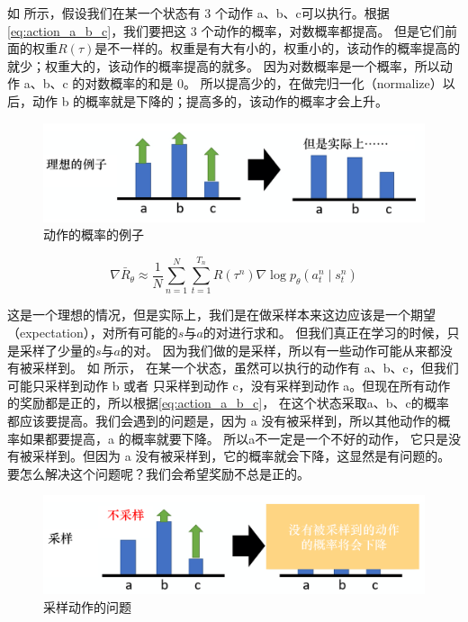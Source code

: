 
如 所示，假设我们在某一个状态有 3 个动作 a、b、c可以执行。根据\eqref{eq:action_a_b_c}，我们要把这 3 个动作的概率，对数概率都提高。 但是它们前面的权重$R(\tau)$是不一样的。权重是有大有小的，权重小的，该动作的概率提高的就少；权重大的，该动作的概率提高的就多。 因为对数概率是一个概率，所以动作 a、b、c 的对数概率的和是 0。 所以提高少的，在做完归一化（normalize）以后，动作 b 的概率就是下降的；提高多的，该动作的概率才会上升。

\begin{figure}[hbt]
    \centering
    \includegraphics[width=0.5\linewidth]{res/ch4/4.12}
    \caption{动作的概率的例子}
    \label{fig:fig4.12}
\end{figure}

\begin{equation}
    \label{eq:action_a_b_c}
    \nabla \bar{R}_{\theta} \approx \frac{1}{N} \sum_{n=1}^{N} \sum_{t=1}^{T_{n}} R\left(\tau^{n}\right) \nabla \log p_{\theta}\left(a_{t}^{n} \mid s_{t}^{n}\right)
\end{equation}

这是一个理想的情况，但是实际上，我们是在做采样本来这边应该是一个期望（expectation），对所有可能的$s$与$a$的对进行求和。 但我们真正在学习的时候，只是采样了少量的$s$与$a$的对。 因为我们做的是采样，所以有一些动作可能从来都没有被采样到。
如 所示，
在某一个状态，虽然可以执行的动作有 a、b、c，但我们可能只采样到动作 b 或者 只采样到动作 c，没有采样到动作 a。但现在所有动作的奖励都是正的，所以根据\eqref{eq:action_a_b_c}，
在这个状态采取a、b、c的概率都应该要提高。我们会遇到的问题是，因为 a 没有被采样到，所以其他动作的概率如果都要提高，a 的概率就要下降。 所以a不一定是一个不好的动作， 它只是没有被采样到。但因为 a 没有被采样到，它的概率就会下降，这显然是有问题的。要怎么解决这个问题呢？我们会希望奖励不总是正的。
\begin{figure}[hbt]
    \centering
    \includegraphics[width=0.5\linewidth]{res/ch4/4.13}
    \caption{采样动作的问题}
    \label{fig:fig4.13}
\end{figure}

